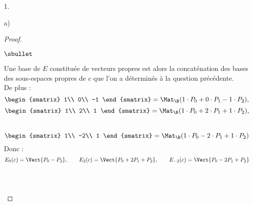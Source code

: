 \documentclass[11pt]{article}%
\begin{document}
\begin{noliste}{1.}
\begin{noliste}{a)}
\begin{proof}
\begin{noliste}{$\sbullet$}
      \item Une base de $E$ constituée de vecteurs propres est alors
        la concaténation des bases des sous-espaces propres de $c$ que
        l'on a déterminés à la question précédente.\\
        De plus :
        \[
        \begin{smatrix}
          1\\
          0\\
          -1
        \end{smatrix}
        = \Mat_{\B}(1 \cdot P_0+ 0\cdot P_1-1 \cdot P_2),
        \]
        \[
        \begin{smatrix}
          1\\
          2\\
          1
        \end{smatrix}
        = \Mat_{\B}(1 \cdot P_0+2 \cdot P_1+1\cdot P_2),
        \]~\\[-.8cm]
        \[
        \begin{smatrix}
          1\\
          -2\\
          1
        \end{smatrix}
        = \Mat_{\B}(1\cdot P_0-2\cdot P_1+1 \cdot P_2)
        \]
        Donc :
        \[
        E_0(c)=\Vect{P_0-P_2}, \qquad E_{2}(c)=\Vect{P_0+2P_1+P_2},
        \qquad E_{-2}(c)=\Vect{P_0-2P_1+P_2}
        \]~\\[-1.4cm]
      
        ~\\[-.8cm]
      \end{noliste}
    \end{proof}
  \end{noliste}
\end{noliste}
\end{document}

